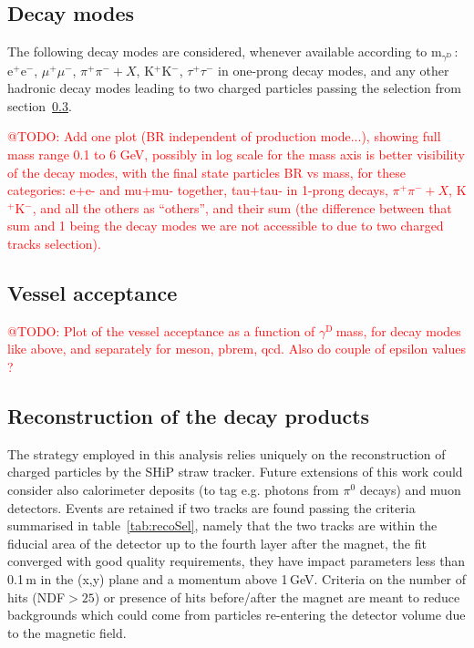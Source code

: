 \documentclass[12pt,a4paper]{article}
\newcommand{\mathDP}{\gamma^{\mathrm{D}}\ }
\newcommand{\DP}{$\mathDP$}
\newcommand{\mDP}{m$_{\mathDP}$}
\begin{document}
\subsection{Decay modes}

The following decay modes are considered, whenever available according
to \mDP: e$^{+}$e$^{-}$, $\mu^{+}\mu^{-}$, $\pi^{+}\pi^{-}+X$,
K$^{+}$K$^{-}$, $\tau^{+}\tau^{-}$ in one-prong decay modes, and any
other hadronic decay modes leading to two charged particles passing the
selection from section~\ref{sec:reco}.

\textcolor{red}{@TODO: Add one plot (BR independent of production
  mode...), showing full mass range 0.1 to 6 GeV, possibly in log
  scale for the mass axis is better visibility of the decay modes,
  with the final state particles BR vs mass, for these categories:
  e+e- and mu+mu- together, tau+tau- in 1-prong decays,
  $\pi^{+}\pi^{-}+X$, K$^{+}$K$^{-}$, and all the others as
  ``others'', and their sum (the difference between that sum and 1
  being the decay modes we are not accessible to due to two charged
  tracks selection).}

\subsection{Vessel acceptance}

\textcolor{red}{@TODO: Plot of the vessel acceptance as a function of
  \DP mass, for decay modes like above, and separately
  for meson, pbrem, qcd. Also do couple of epsilon values ?}

\subsection{Reconstruction of the decay products}
\label{sec:reco}

The strategy employed in this analysis relies uniquely on the
reconstruction of charged particles by the SHiP straw tracker. Future
extensions of this work could consider also calorimeter deposits (to
tag e.g. photons from $\pi^0$ decays) and muon detectors. Events are
retained if two tracks are found passing the criteria summarised in
table~\ref{tab:recoSel}, namely that the two tracks are within the
fiducial area of the detector up to the fourth layer after the magnet,
the fit converged with good quality requirements, they have impact
parameters less than 0.1\,m in the (x,y) plane and a momentum above
1\,GeV. Criteria on the number of hits (NDF$>25$) or presence of hits
before/after the magnet are meant to reduce backgrounds which could
come from particles re-entering the detector volume due to the
magnetic field.
\end{document}
